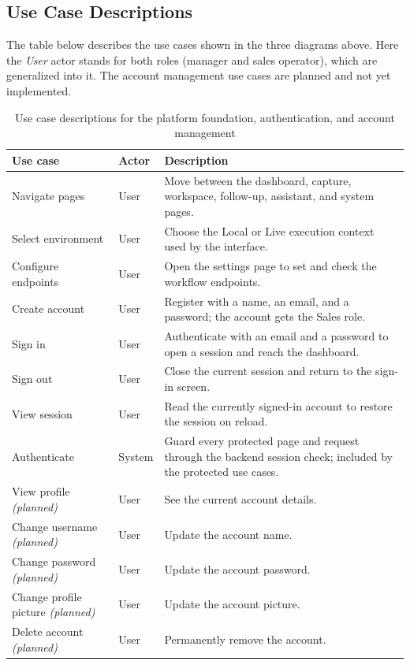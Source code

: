\documentclass[12pt,a4paper,oneside]{report}
\begin{document}
\subsection{Use Case Descriptions}\label{sumlbl:c5s3ss2}
The table below describes the use cases shown in the three diagrams above. Here the \emph{User} actor stands for both roles (manager and sales operator), which are generalized into it. The account management use cases are planned and not yet implemented.

\begin{table}[H]
\centering
\small
\begin{tabularx}{\textwidth}{|p{3.9cm}|p{2.2cm}|X|}
\hline\rowcolor{TabHead}
\textbf{Use case} & \textbf{Actor} & \textbf{Description} \\
\hline
Navigate pages & User & Move between the dashboard, capture, workspace, follow-up, assistant, and system pages. \\
\hline
Select environment & User & Choose the Local or Live execution context used by the interface. \\
\hline
Configure endpoints & User & Open the settings page to set and check the workflow endpoints. \\
\hline
Create account & User & Register with a name, an email, and a password; the account gets the Sales role. \\
\hline
Sign in & User & Authenticate with an email and a password to open a session and reach the dashboard. \\
\hline
Sign out & User & Close the current session and return to the sign-in screen. \\
\hline
View session & User & Read the currently signed-in account to restore the session on reload. \\
\hline
Authenticate & System & Guard every protected page and request through the backend session check; included by the protected use cases. \\
\hline
View profile \emph{(planned)} & User & See the current account details. \\
\hline
Change username \emph{(planned)} & User & Update the account name. \\
\hline
Change password \emph{(planned)} & User & Update the account password. \\
\hline
Change profile picture \emph{(planned)} & User & Update the account picture. \\
\hline
Delete account \emph{(planned)} & User & Permanently remove the account. \\
\hline
\end{tabularx}
\caption{Use case descriptions for the platform foundation, authentication, and account management}
\end{table}
\end{document}
